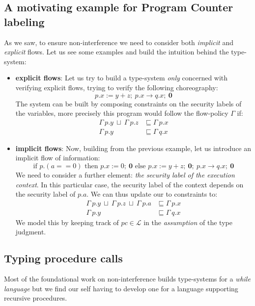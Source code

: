\documentclass[12pt,a4paper,twoside]{book}
\begin{document}
\subsection{A motivating example for Program Counter labeling}
As we saw, to ensure non-interference we need to consider both \textit{implicit} and \textit{explicit} flows.
Let us see some examples and build the intuition behind the type-system:
\begin{itemize}
	\item{\textbf{explicit flows}}: Let us try to build a type-system \textit{only} concerned with verifying explicit flows, trying to verify the following choreography:
$$ p.x := y + z; ~ p.x \rightarrow q.x; ~ \boldsymbol{0} $$
	The system can be built by composing constraints on the security labels of the variables, more precisely this program would follow the flow-policy $\Gamma$ if:
	\begin{align*}
		\Gamma~p.y ~\sqcup~ \Gamma~p.z &\sqsubseteq \Gamma~p.x\\
		\Gamma~p.y &\sqsubseteq \Gamma~q.x
	\end{align*}
	\item{\textbf{implicit flows}}: Now, building from the previous example, let us introduce an implicit flow of information:
	$$ \text{if } p.(a == 0) \text{ then } p.x := 0; ~ \boldsymbol{0} \text{ else } p.x := y + z; ~ \boldsymbol{0}; ~ p.x \rightarrow q.x; ~ \boldsymbol{0} $$
	We need to consider a further element: \textit{the security label of the execution context}. In this particular case, the security label of the context depends on the security label of $p.a$. We can thus update our to constraints to:
	\begin{align*}
		\Gamma~p.y~\sqcup~\Gamma~p.z~\sqcup~\Gamma~p.a &\sqsubseteq \Gamma~p.x\\
		\Gamma~p.y &\sqsubseteq \Gamma~q.x
	\end{align*}
	We model this by keeping track of $pc \in \mathscr{L}$ in the \textit{assumption} of the type judgment.
\end{itemize}

\subsection{Typing procedure calls}
Most of the foundational work on non-interference\cite{sabelfeld2003language} builds type-systems for a \textit{while language} but we find our self having to develop one for a language supporting recursive procedures.
\end{document}
